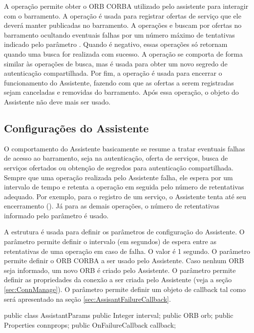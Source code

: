 A operação  permite obter o ORB CORBA utilizado pelo assistente para interagir com o barramento.
A operação  é usada para registrar ofertas de serviço que ele deverá manter publicadas no barramento.
A operações  e  buscam por ofertas no barramento ocultando eventuais falhas por um número máximo de tentativas indicado pelo parâmetro .
Quando  é negativo, essas operações só retornam quando uma busca for realizada com sucesso.
A operação  se comporta de forma similar às operações de busca, mas é usada para obter um novo segredo de autenticação compartilhada.
Por fim, a operação  é usada para encerrar o funcionamento do Assistente, fazendo com que as ofertas a serem registradas sejam canceladas e removidas do barramento.
Após essa operação, o objeto do Assistente não deve mais ser usado.

\subsection{Configurações do Assistente}

O comportamento do Assistente basicamente se resume a tratar eventuais falhas de acesso ao barramento, seja na autenticação, oferta de serviços, busca de serviços ofertados ou obtenção de segredos para autenticação compartilhada.
Sempre que uma operação realizada pelo Assistente falha, ele espera por um intervalo de tempo e retenta a operação em seguida pelo número de retentativas adequado.
Por exemplo, para o registro de um serviço, o Assistente tenta até seu encerramento ().
Já para as demais operações, o número de retentativas informado pelo parâmetro  é usado.

A estrutura  é usada para definir os parâmetros de configuração do Assistente.
O parâmetro  permite definir o intervalo (em segundos) de espera entre as retentativas de uma operação em caso de falha.
O valor  é 1 segundo.
O parâmetro  permite definir o ORB CORBA a ser usado pelo Assistente.
Caso nenhum ORB seja informado, um novo ORB é criado pelo Assistente.
O parâmetro  permite definir as propriedades da conexão a ser criada pelo Assistente (veja a seção \ref{sec:ConnManage}).
O parâmetro  permite definir um objeto de callback tal como será apresentado na seção \ref{sec:AssisantFailureCallback}.

\begin{samplecode}
public class AssistantParams {
  public Integer interval;
  public ORB orb;
  public Properties connprops;
  public OnFailureCallback callback;
}
\end{samplecode}

